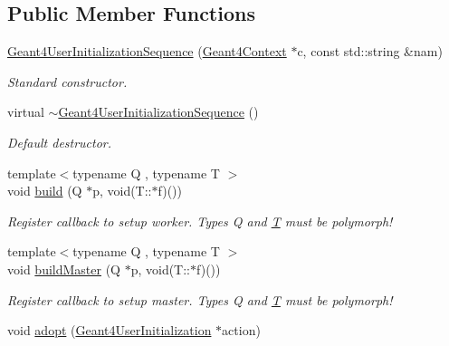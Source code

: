 \subsection*{Public Member Functions}
\begin{DoxyCompactItemize}
\item 
\hyperlink{class_d_d4hep_1_1_simulation_1_1_geant4_user_initialization_sequence_a98a41e1dc518fea9eb882df8b2f62e0d}{Geant4UserInitializationSequence} (\hyperlink{class_d_d4hep_1_1_simulation_1_1_geant4_context}{Geant4Context} $\ast$c, const std::string \&nam)
\begin{DoxyCompactList}\small\item\em Standard constructor. \item\end{DoxyCompactList}\item 
virtual \hyperlink{class_d_d4hep_1_1_simulation_1_1_geant4_user_initialization_sequence_aa593a6ec771aea3c621f4da1cb2beaf6}{$\sim$Geant4UserInitializationSequence} ()
\begin{DoxyCompactList}\small\item\em Default destructor. \item\end{DoxyCompactList}\item 
{\footnotesize template$<$typename Q , typename T $>$ }\\void \hyperlink{class_d_d4hep_1_1_simulation_1_1_geant4_user_initialization_sequence_aa65113bb4e4f4b3d775dcdc9cc30b4b8}{build} (Q $\ast$p, void(T::$\ast$f)())
\begin{DoxyCompactList}\small\item\em Register callback to setup worker. Types Q and \hyperlink{class_t}{T} must be polymorph! \item\end{DoxyCompactList}\item 
{\footnotesize template$<$typename Q , typename T $>$ }\\void \hyperlink{class_d_d4hep_1_1_simulation_1_1_geant4_user_initialization_sequence_a7dfd58583e86652aaf675c6db82ff39c}{buildMaster} (Q $\ast$p, void(T::$\ast$f)())
\begin{DoxyCompactList}\small\item\em Register callback to setup master. Types Q and \hyperlink{class_t}{T} must be polymorph! \item\end{DoxyCompactList}\item 
void \hyperlink{class_d_d4hep_1_1_simulation_1_1_geant4_user_initialization_sequence_a00f01d23b874b3c99c6877ce01b6b702}{adopt} (\hyperlink{class_d_d4hep_1_1_simulation_1_1_geant4_user_initialization}{Geant4UserInitialization} $\ast$action)

\end{DoxyCompactItemize}
